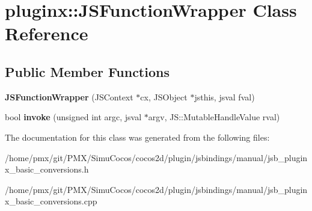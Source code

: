 \hypertarget{classpluginx_1_1JSFunctionWrapper}{}\section{pluginx\+:\+:J\+S\+Function\+Wrapper Class Reference}
\label{classpluginx_1_1JSFunctionWrapper}
\subsection*{Public Member Functions}
\begin{DoxyCompactItemize}
\item 
\mbox{\label{classpluginx_1_1JSFunctionWrapper_ab7ea8dd3101ea5657c71388fb6ce9d4c}} 
{\bfseries J\+S\+Function\+Wrapper} (J\+S\+Context $\ast$cx, J\+S\+Object $\ast$jsthis, jsval fval)
\item 
\mbox{\label{classpluginx_1_1JSFunctionWrapper_ad34d8f1927a57ee18d78644de2ba444b}} 
bool {\bfseries invoke} (unsigned int argc, jsval $\ast$argv, J\+S\+::\+Mutable\+Handle\+Value rval)
\end{DoxyCompactItemize}


The documentation for this class was generated from the following files\+:\begin{DoxyCompactItemize}
\item 
/home/pmx/git/\+P\+M\+X/\+Simu\+Cocos/cocos2d/plugin/jsbindings/manual/jsb\+\_\+pluginx\+\_\+basic\+\_\+conversions.\+h\item 
/home/pmx/git/\+P\+M\+X/\+Simu\+Cocos/cocos2d/plugin/jsbindings/manual/jsb\+\_\+pluginx\+\_\+basic\+\_\+conversions.\+cpp\end{DoxyCompactItemize}
